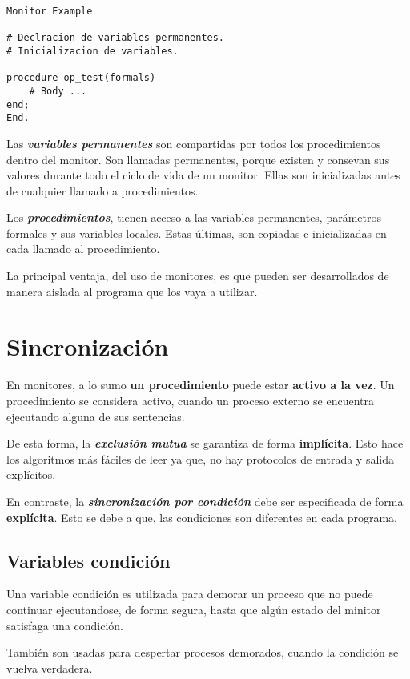 \documentclass[a4paper, 10pt]{report}
\begin{document}
\begin{lstlisting}
Monitor Example

# Declracion de variables permanentes.
# Inicializacion de variables.

procedure op_test(formals)
	# Body ...
end;
End.
\end{lstlisting}

Las \textbf{\emph{variables permanentes}} son compartidas por todos los procedimientos dentro del monitor. Son llamadas permanentes, porque existen y consevan sus valores durante todo el ciclo de vida de un monitor. Ellas son inicializadas antes de cualquier llamado a procedimientos.

Los \textbf{\emph{procedimientos}}, tienen acceso a las variables permanentes, parámetros formales y sus variables locales. Estas últimas, son copiadas e inicializadas en cada llamado al procedimiento.

La principal ventaja, del uso de monitores, es que pueden ser desarrollados de manera aislada al programa que los vaya a utilizar.

\section{Sincronización}

En monitores, a lo sumo \textbf{un procedimiento} puede estar \textbf{activo a la vez}. Un procedimiento se considera activo, cuando un proceso externo se encuentra ejecutando alguna de sus sentencias. 

De esta forma, la \textbf{\emph{exclusión mutua}} se garantiza de forma \textbf{implícita}. Esto hace los algoritmos más fáciles de leer ya que, no hay protocolos de entrada y salida explícitos.

En contraste, la \textbf{\emph{sincronización por condición}} debe ser especificada de forma \textbf{explícita}. Esto se debe a que, las condiciones son diferentes en cada programa.

\subsection{Variables condición}

Una variable condición es utilizada para demorar un proceso que no puede continuar ejecutandose, de forma segura, hasta que algún estado del minitor satisfaga una condición. 

También son usadas para despertar procesos demorados, cuando la condición se vuelva verdadera. 
\end{document}
